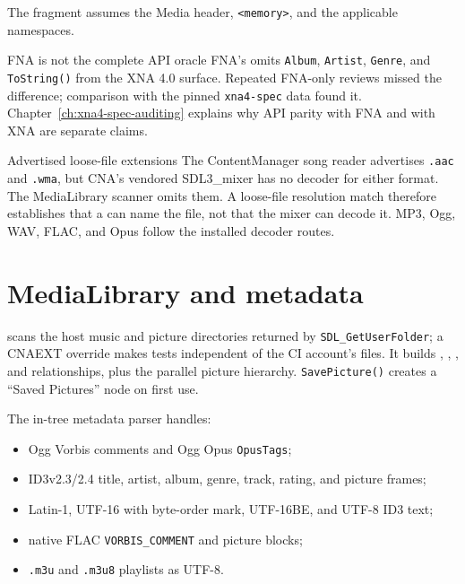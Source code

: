 The fragment assumes the Media header, \texttt{<memory>}, and the applicable namespaces.

\begin{historynote}{FNA is not the complete API oracle}
FNA's  omits \texttt{Album}, \texttt{Artist}, \texttt{Genre}, and
\texttt{ToString()} from the XNA 4.0 surface. Repeated FNA-only reviews missed the difference;
comparison with the pinned \texttt{xna4-spec} data found it. Chapter~\ref{ch:xna4-spec-auditing}
explains why API parity with FNA and with XNA are separate claims.
\end{historynote}

\begin{limitationnote}{Advertised loose-file extensions}
The ContentManager song reader advertises \texttt{.aac} and \texttt{.wma}, but CNA's vendored
SDL3\_mixer has no decoder for either format. The MediaLibrary scanner omits them. A loose-file
resolution match therefore establishes that a  can name the file, not that the
mixer can decode it. MP3, Ogg, WAV, FLAC, and Opus follow the installed decoder routes.
\end{limitationnote}

\section{MediaLibrary and metadata}
\label{sec:medialibrary}

 scans the host music and picture directories returned by
\texttt{SDL\_GetUserFolder}; a CNAEXT override makes tests independent of the CI account's
files. It builds , , , and
 relationships, plus the parallel picture hierarchy. \texttt{SavePicture()}
creates a ``Saved Pictures'' node on first use.

The in-tree metadata parser handles:

\begin{itemize}
  \item Ogg Vorbis comments and Ogg Opus \texttt{OpusTags};
  \item ID3v2.3/2.4 title, artist, album, genre, track, rating, and picture frames;
  \item Latin-1, UTF-16 with byte-order mark, UTF-16BE, and UTF-8 ID3 text;
  \item native FLAC \texttt{VORBIS\_COMMENT} and picture blocks;
  \item \texttt{.m3u} and \texttt{.m3u8} playlists as UTF-8.
\end{itemize}

